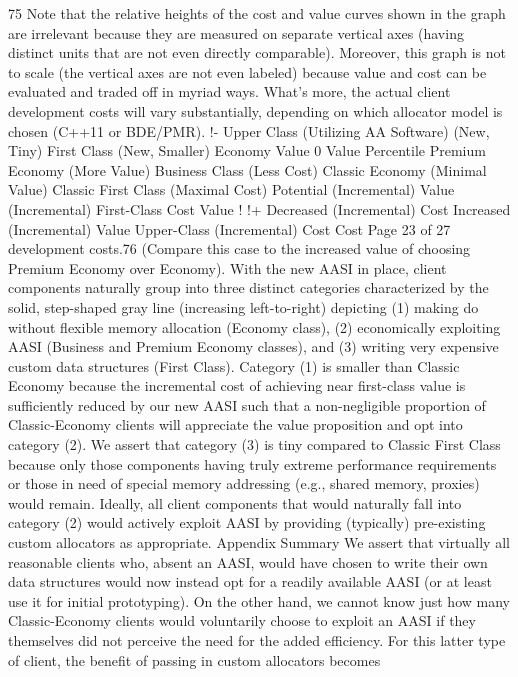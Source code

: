75 Note that the relative heights of the cost and value curves shown in the graph are irrelevant
because they are measured on separate vertical axes (having distinct units that are not even directly
comparable). Moreover, this graph is not to scale (the vertical axes are not even labeled) because
value and cost can be evaluated and traded off in myriad ways. What’s more, the actual client
development costs will vary substantially, depending on which allocator model is chosen (C++11 or
BDE/PMR).
!-
Upper Class
(Utilizing AA Software)
(New, Tiny)
First Class (New, Smaller)
Economy
Value
0%
Value
Percentile
Premium Economy
(More Value)
Business Class
(Less Cost)
Classic Economy
(Minimal Value)
Classic First Class
(Maximal Cost)
Potential
(Incremental)
Value
(Incremental) First-Class Cost
Value
! !+
Decreased
(Incremental)
Cost
Increased
(Incremental)
Value
Upper-Class
(Incremental)
Cost
Cost
Page 23 of 27
development costs.76 (Compare this case to the increased value of choosing Premium
Economy over Economy).
With the new AASI in place, client components naturally group into three distinct
categories characterized by the solid, step-shaped gray line (increasing left-to-right)
depicting (1) making do without flexible memory allocation (Economy class), (2)
economically exploiting AASI (Business and Premium Economy classes), and (3)
writing very expensive custom data structures (First Class). Category (1) is smaller
than Classic Economy because the incremental cost of achieving near first-class
value is sufficiently reduced by our new AASI such that a non-negligible proportion
of Classic-Economy clients will appreciate the value proposition and opt into
category (2). We assert that category (3) is tiny compared to Classic First Class
because only those components having truly extreme performance requirements or
those in need of special memory addressing (e.g., shared memory, proxies) would
remain. Ideally, all client components that would naturally fall into category (2)
would actively exploit AASI by providing (typically) pre-existing custom allocators as
appropriate.
Appendix Summary
We assert that virtually all reasonable clients who, absent an AASI, would have
chosen to write their own data structures would now instead opt for a readily
available AASI (or at least use it for initial prototyping). On the other hand, we
cannot know just how many Classic-Economy clients would voluntarily choose to
exploit an AASI if they themselves did not perceive the need for the added efficiency.
For this latter type of client, the benefit of passing in custom allocators becomes
